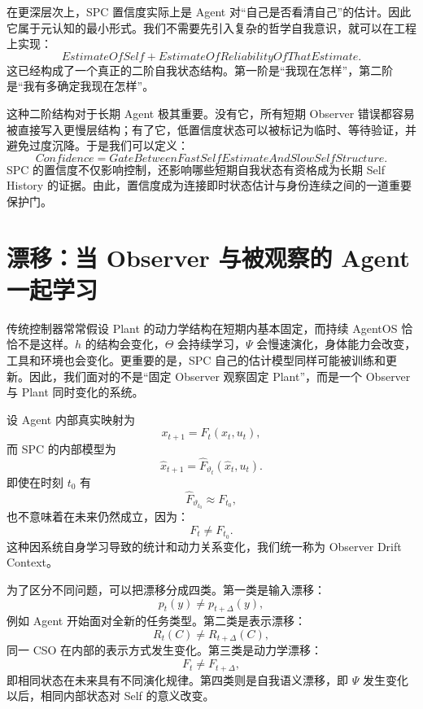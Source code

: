 在更深层次上，SPC 置信度实际上是 Agent 对“自己是否看清自己”的估计。因此它属于元认知的最小形式。我们不需要先引入复杂的哲学自我意识，就可以在工程上实现：
\begin{equation}
\boxed{
EstimateOfSelf
+
EstimateOfReliabilityOfThatEstimate.
}
\end{equation}
这已经构成了一个真正的二阶自我状态结构。第一阶是“我现在怎样”，第二阶是“我有多确定我现在怎样”。

这种二阶结构对于长期 Agent 极其重要。没有它，所有短期 Observer 错误都容易被直接写入更慢层结构；有了它，低置信度状态可以被标记为临时、等待验证，并避免过度沉降。于是我们可以定义：
\begin{equation}
\boxed{
Confidence
=
GateBetweenFastSelfEstimateAndSlowSelfStructure.
}
\end{equation}
SPC 的置信度不仅影响控制，还影响哪些短期自我状态有资格成为长期 Self History 的证据。由此，置信度成为连接即时状态估计与身份连续之间的一道重要保护门。

\section{漂移：当 Observer 与被观察的 Agent 一起学习}
\label{sec:spc-drift}

传统控制器常常假设 Plant 的动力学结构在短期内基本固定，而持续 AgentOS 恰恰不是这样。$h$ 的结构会变化，$\Theta$ 会持续学习，$\Psi$ 会慢速演化，身体能力会改变，工具和环境也会变化。更重要的是，SPC 自己的估计模型同样可能被训练和更新。因此，我们面对的不是“固定 Observer 观察固定 Plant”，而是一个 Observer 与 Plant 同时变化的系统。

设 Agent 内部真实映射为
\begin{equation}
x_{t+1}
=
F_t(x_t,u_t),
\end{equation}
而 SPC 的内部模型为
\begin{equation}
\hat x_{t+1}
=
\hat F_{\vartheta_t}(\hat x_t,u_t).
\end{equation}
即使在时刻 $t_0$ 有
\begin{equation}
\hat F_{\vartheta_{t_0}}
\approx
F_{t_0},
\end{equation}
也不意味着在未来仍然成立，因为：
\begin{equation}
F_t
\neq
F_{t_0}.
\end{equation}
这种因系统自身学习导致的统计和动力关系变化，我们统一称为 Observer Drift Context。

为了区分不同问题，可以把漂移分成四类。第一类是输入漂移：
\begin{equation}
p_t(y)
\neq
p_{t+\Delta}(y),
\end{equation}
例如 Agent 开始面对全新的任务类型。第二类是表示漂移：
\begin{equation}
R_t(C)
\neq
R_{t+\Delta}(C),
\end{equation}
同一 CSO 在内部的表示方式发生变化。第三类是动力学漂移：
\begin{equation}
F_t
\neq
F_{t+\Delta},
\end{equation}
即相同状态在未来具有不同演化规律。第四类则是自我语义漂移，即 $\Psi$ 发生变化以后，相同内部状态对 Self 的意义改变。

